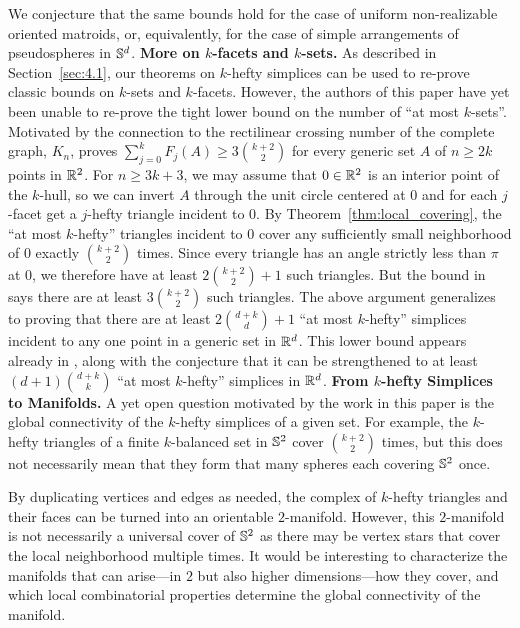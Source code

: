 \documentclass[10pt,a4paper]{article}
\newcommand {\mm}[1] {\ifmmode{#1}\else{\mbox{\(#1\)}}\fi}
\theoremstyle{plain}
\newcommand{\Rspace}        {\mm{{\mathbb R}}}
\newcommand{\Sspace}        {\mm{{\mathbb S}}}
\begin{document}
\smallskip
We conjecture that the same bounds hold for the case of uniform non-realizable oriented matroids, or, equivalently, for the case of simple arrangements of pseudospheres in $\Sspace^d$.
\medskip \noindent
\textbf{More on $k$-facets and $k$-sets.}
As described in Section~\ref{sec:4.1}, our theorems on $k$-hefty simplices can be used to re-prove classic bounds on $k$-sets and $k$-facets.
However, the authors of this paper have yet been unable to re-prove the tight lower bound on the number of ``at most $k$-sets''.
Motivated by the connection to the rectilinear crossing number of the complete graph, $K_n$, \cite{LVWW04} proves $\sum_{j=0}^k F_j(A) \geq 3 \binom{k+2}{2}$ for every generic set $A$ of $n \geq 2k$ points in $\Rspace^2$.
For $n \geq 3k+3$, we may assume that $0 \in \Rspace^2$ is an interior point of the $k$-hull, so we can invert $A$ through the unit circle centered at $0$ and for each $j$-facet get a $j$-hefty triangle incident to $0$.
By Theorem~\ref{thm:local_covering}, the ``at most $k$-hefty'' triangles incident to $0$ cover any sufficiently small neighborhood of $0$ exactly $\binom{k+2}{2}$ times.
Since every triangle has an angle strictly less than $\pi$ at $0$, we therefore have at least $2 \binom{k+2}{2} + 1$ such triangles.
But the bound in \cite{LVWW04} says there are at least $3 \binom{k+2}{2}$ such triangles.
\smallskip
The above argument generalizes to proving that there are at least $2 \binom{d+k}{d} + 1$ ``at most $k$-hefty'' simplices incident to any one point in a generic set in $\Rspace^d$.
This lower bound appears already in \cite[Theorem~6.3]{Wag03}, along with the conjecture that it can be strengthened to at least $(d+1) \binom{d+k}{k}$ ``at most $k$-hefty'' simplices in $\Rspace^d$.
\medskip \noindent
\textbf{From $k$-hefty Simplices to Manifolds.}
A yet open question motivated by the work in this paper is the global connectivity of the $k$-hefty simplices of a given set.
For example, the $k$-hefty triangles of a finite $k$-balanced set in $\Sspace^2$ cover $\binom{k+2}{2}$ times, but this does not necessarily mean that they form that many spheres each covering $\Sspace^2$ once.
 
  
\smallskip
By duplicating vertices and edges as needed, the complex of $k$-hefty triangles and their faces can be turned into an orientable $2$-manifold.
However, this $2$-manifold is not necessarily a universal cover of $\Sspace^2$ as there may be vertex stars that cover the local neighborhood multiple times.
It would be interesting to characterize the manifolds that can arise---in $2$ but also higher dimensions---how they cover, and which local combinatorial properties determine the global connectivity of the manifold.
\end{document}
